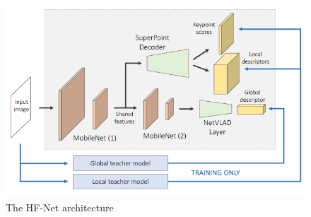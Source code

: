 \documentclass[conference]{IEEEtran}
\begin{document}
\begin{figure}
\centerline{\includegraphics[scale=0.5]{Pics/HF-Net Architecture.png}}
\caption{The HF-Net architecture \cite{b9}}
\label{fig:HF-Net}
\end{figure}
\end{document}
